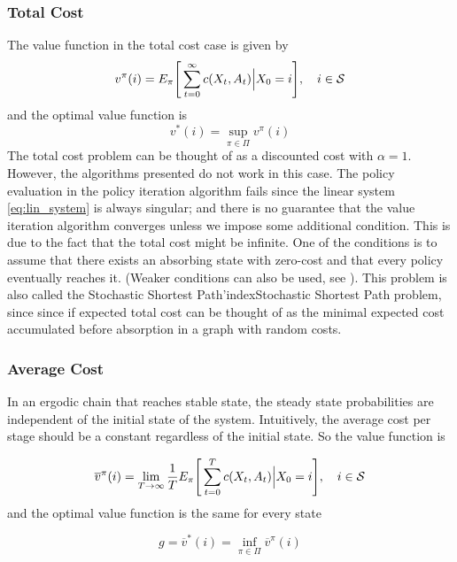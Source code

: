 \documentclass[11pt]{article}
\newcommand {\cS}{\ensuremath \mathcal{S}}
\begin{document}
\subsubsection{Total Cost}

The value function in the total cost case is given by
\[v^{\pi}(i)=E_{\pi}\Bigg[\sum_{t=0}^\infty c(X_t,A_t)\Big|X_0=i\Bigg],\quad i\in \cS\]
and the optimal value function is
\[v^*(i)=\sup_{\pi \in \Pi} v^{\pi}(i)\]
The total cost problem can be thought of as a discounted cost with $\alpha=1$.
However, the algorithms presented do not work in this case. The policy evaluation in the policy iteration algorithm fails since the linear system \eqref{eq:lin_system} is always singular; and there is no guarantee that the value iteration algorithm  converges unless we impose some additional condition. This is due to the fact that the total cost might be infinite. One of the conditions is to assume that there exists an absorbing state with zero-cost and that every policy eventually reaches it. (Weaker conditions can also be used, see \cite{bertsekas} ). This problem is also called the Stochastic Shortest Path'index{Stochastic Shortest Path} problem, since since if  expected total cost can be thought of as the minimal expected cost accumulated before absorption in a graph with random costs.

\subsubsection{Average Cost}

In an ergodic chain that reaches stable state, the steady state probabilities are independent of the initial state of the system. Intuitively, the average cost per stage should be a constant regardless of the initial state. So the value function is

\[\overline{v}^{\pi}(i)=\lim_{T\rightarrow \infty}\frac{1}{T}E_{\pi}\Bigg[\sum_{t=0}^T c(X_t,A_t)\Big|X_0=i\Bigg],\quad i\in \cS\]
and the optimal value function is the same for every state

\[g=\overline{v}^*(i)=\inf_{\pi \in \Pi} \overline{v}^{\pi}(i)\]
\end{document}
